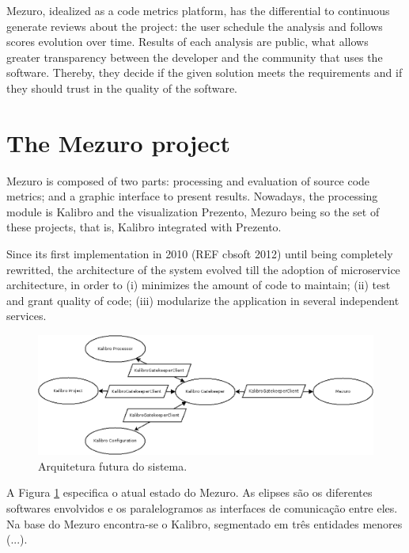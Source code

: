\documentclass{llncs}
\begin{document}
Mezuro, idealized as a code metrics platform, has the differential to
continuous generate reviews about the project: the user schedule the
analysis and follows scores evolution over time. Results of each analysis
are public, what allows greater transparency between the developer and the
community that uses the software. Thereby, they decide if the given solution
meets the requirements and if they should trust in the quality of the software.

\section{The Mezuro project}
\label{sec:mezuro}

Mezuro is composed of two parts: processing and evaluation of source code
metrics; and a graphic interface to present results. Nowadays, the processing
module is Kalibro and the visualization Prezento, Mezuro being so the set of
these projects, that is, Kalibro integrated with Prezento.

Since its first implementation in 2010 (REF cbsoft 2012) until being completely
rewritted, the architecture of the system evolved till the adoption of 
microservice architecture, in order to (i) minimizes the amount of code to
maintain;
(ii) test and grant quality of code;
(iii) modularize the application in several independent services.

\begin{figure}[H]
  \centering
    \includegraphics[width=\textwidth]{images/mezuro-architecture-predicted.png}
  \caption{Arquitetura futura do sistema.}
  \label{fig:architecture-2}
\end{figure}


A Figura \ref{fig:architecture-2} especifica o atual estado do Mezuro. As
elipses são os diferentes softwares envolvidos e os paralelogramos as
interfaces de comunicação entre eles. Na base do Mezuro encontra-se o Kalibro,
segmentado em três entidades menores (...).
\end{document}
